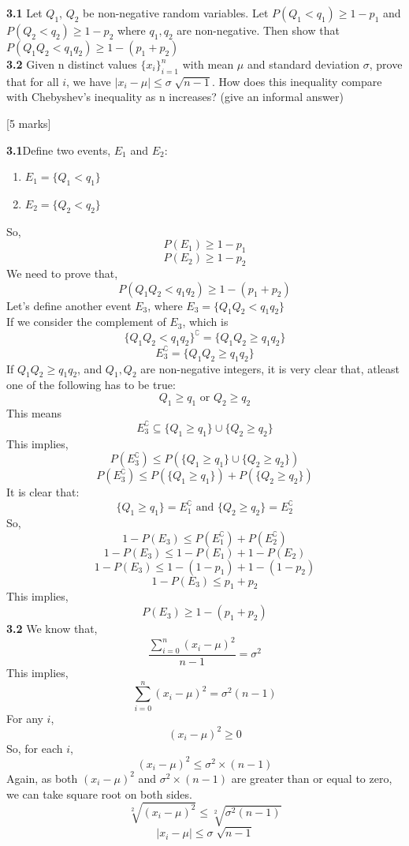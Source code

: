 \begin{que}
		\textbf{3.1} Let $Q_{1}$, $Q_{2}$ be non-negative random variables. Let $P(Q_1 < q_1) \geq 1-p_1$ and $P(Q_2 < q_2) \geq 1-p_2$
		where $q_1, q_2$ are non-negative. Then show that $P(Q_1Q_2 < q_1q_2) \geq 1 - (p_1 + p_2)$\\
		\textbf{3.2} Given n distinct values ${\{x_i\}}^n_{i=1}$ with mean $\mu$ and standard deviation $\sigma$, prove that for all $i$,
		we have $|x_i - \mu| \leq \sigma \sqrt[]{n-1}$. How does this inequality compare with Chebyshev's inequality as n
		increases? (give an informal answer)
	

	\hspace*{\fill} [5 marks]
\end{que}

\begin{tcolorbox}[breakable]
	\begin{sol}
		\textbf{3.1}Define two events, $E_1$ and $E_2$:
		\begin{enumerate}
			\item $E_1=\{Q_1<q_1\}$
			\item $E_2=\{Q_2<q_2\}$
		\end{enumerate}
		So,
		\[P(E_1)\geq 1-p_1\]
		\[P(E_2)\geq 1-p_2\]
		We need to prove that,
		\[ P(Q_1Q_2 < q_1q_2) \geq 1 - (p_1 + p_2)\]
		Let's define another event $E_3$, where $E_3=\{Q_1Q_2 < q_1q_2\}$\\
		If we consider the complement of $E_3$, which is
		\[\{Q_1Q_2 < q_1q_2\}^\complement=\{Q_1Q_2 \geq q_1q_2\}\]
		\[E_3^\complement=\{Q_1Q_2 \geq q_1q_2\}\]
		\clearpage
		If $Q_1Q_2 \geq q_1q_2$, and $Q_1,Q_2$ are non-negative integers, it is very clear that, atleast one of the following has to be true:
		\[Q_1\geq q_1 \text{ or }Q_2\geq q_2 \]
		This means \[E_3^\complement \subseteq \{Q_1\geq q_1\}\cup\{Q_2\geq q_2\} \]
		This implies,
		\[P(E_3^\complement)\leq P(\{Q_1\geq q_1\}\cup\{Q_2\geq q_2\} )\]
		\[P(E_3^\complement)\leq P(\{Q_1\geq q_1\})+P(\{Q_2\geq q_2\} )\]
		It is clear that:
		\[\{Q_1\geq q_1\} = E_1^\complement \text{ and } \{Q_2\geq q_2\} = E_2^\complement\]
		So,
		\[1-P(E_3)\leq P(E_1^\complement) + P(E_2^\complement)\]
		\[1-P(E_3)\leq 1-P(E_1) + 1-P(E_2)\]
		\[1-P(E_3)\leq 1-(1-p_1) + 1-(1-p_2)\]
		\[1-P(E_3)\leq p_1 +p_2\]
		This implies,
		\[P(E_3)\geq 1-(p_1+p_2)\]
		\textbf{3.2} We know that,
		\[\frac{\sum^n_{i=0}(x_i-\mu)^2}{n-1}=\sigma^2\]
		This implies,
		\[\sum^n_{i=0}(x_i-\mu)^2 = \sigma^2(n-1)\]
		For any $i$,
		\[(x_i-\mu)^2\geq0\]
		So, for each $i$,
		\[(x_i-\mu)^2\leq\sigma^2\times(n-1)\]
		Again, as both $(x_i-\mu)^2$ and $\sigma^2\times(n-1)$ are greater than or equal to zero, we can take square root on both sides.
		\[\sqrt[2]{(x_i-\mu)^2}\leq\sqrt[2]{\sigma^2(n-1)}\]
		\[|x_i-\mu|\leq\sigma\sqrt[]{n-1}\]


	\end{sol}
\end{tcolorbox}
